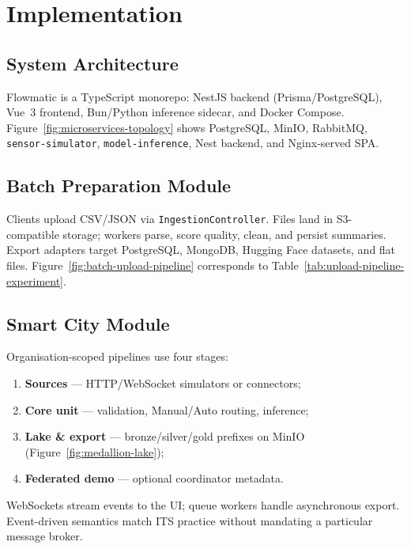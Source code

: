 %
%

\chapter{Implementation}
\label{chap:implementation}

\section{System Architecture}

Flowmatic is a TypeScript monorepo: NestJS backend (Prisma/PostgreSQL), Vue~3 frontend, Bun/Python inference sidecar, and Docker Compose. Figure~\ref{fig:microservices-topology} shows PostgreSQL, MinIO, RabbitMQ, \texttt{sensor-simulator}, \texttt{model-inference}, Nest backend, and Nginx-served SPA.

\section{Batch Preparation Module}

Clients upload CSV/JSON via \texttt{IngestionController}. Files land in S3-compatible storage; workers parse, score quality, clean, and persist summaries. Export adapters target PostgreSQL, MongoDB, Hugging Face datasets, and flat files. Figure~\ref{fig:batch-upload-pipeline} corresponds to Table~\ref{tab:upload-pipeline-experiment}.

\section{Smart City Module}

Organisation-scoped pipelines use four stages:
\begin{enumerate}
  \item \textbf{Sources} --- HTTP/WebSocket simulators or connectors;
  \item \textbf{Core unit} --- validation, Manual/Auto routing, inference;
  \item \textbf{Lake \& export} --- bronze/silver/gold prefixes on MinIO (Figure~\ref{fig:medallion-lake});
  \item \textbf{Federated demo} --- optional coordinator metadata.
\end{enumerate}

WebSockets stream events to the UI; queue workers handle asynchronous export. Event-driven semantics match ITS practice without mandating a particular message broker.

